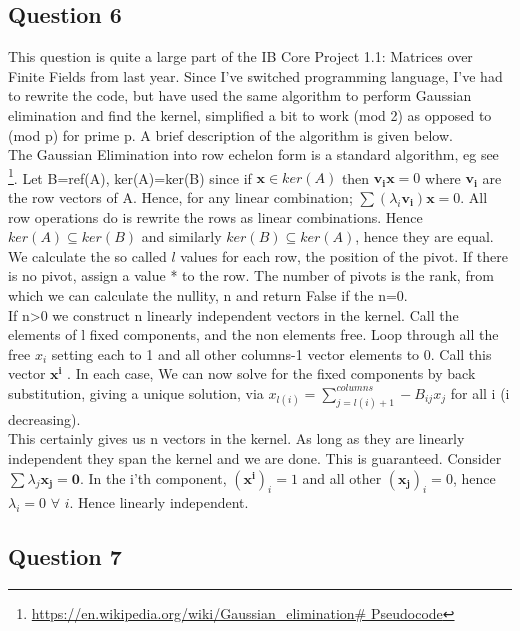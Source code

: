 \documentclass[10pt,a4paper]{report}
\begin{document}
\subsection*{Question 6}

This question is quite a large part of the IB Core Project 1.1: Matrices over Finite Fields from last year. Since I've switched programming language, I've had to rewrite the code, but have used the same algorithm to perform Gaussian elimination and find the kernel, simplified a bit to work (mod 2) as opposed to (mod p) for prime p. A brief description of the algorithm is given below.\\

The Gaussian Elimination into row echelon form is a standard algorithm, eg see \footnote{\url{https://en.wikipedia.org/wiki/Gaussian_elimination\# Pseudocode}}. Let B=ref(A), ker(A)=ker(B) since if $\bm{x} \in ker(A)$ then $\bm{v_i}\bm{x}=0$ where $\bm{v_i}$ are the row vectors of A. Hence, for any linear combination; $\sum( \lambda_i \bm{v_i})\bm{x}=0$. All row operations do is rewrite the rows as linear combinations. Hence $ker(A)\subseteq ker(B)$ and similarly $ker(B)\subseteq ker(A)$, hence they are equal.\\

We calculate the so called $l$ values for each row, the position of the pivot. If there is no pivot, assign a value * to the row. The number of pivots is the rank, from which we can calculate the nullity, n and return False if the n=0. \\

If n>0 we construct n linearly independent vectors in the kernel. Call the elements of l fixed components, and the non elements free. Loop through all the free $x_i$ setting each to 1 and all other columns-1 vector elements to 0. Call this vector $\bm{x^i}$ . In each case, We can now solve for the fixed components by back substitution, giving a unique solution, via $x_{l(i)}=\sum_{j=l(i)+1}^{columns} -B_{ij}x_j$ for all i (i decreasing). \\

This certainly gives us n vectors in the kernel. As long as they are linearly independent they span the kernel and we are done. This is guaranteed. Consider
$\sum\lambda_j \bm{x_j} =\bm{0}$. In the i'th component, $(\bm{x^i})_i=1$ and all other $(\bm{x_j})_i=0$, hence $\lambda_i=0$ $\forall$ $i$. Hence linearly independent.\\

\subsection*{Question 7}
\end{document}
